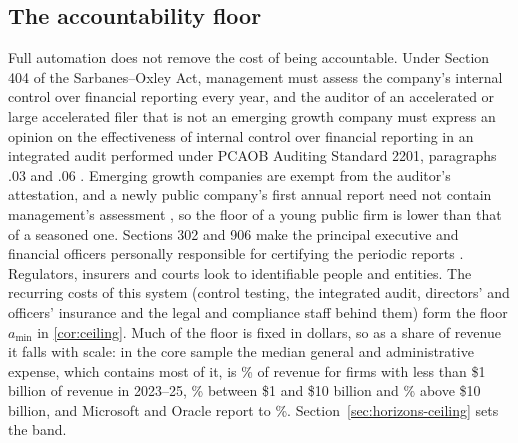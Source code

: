 \subsection{The accountability floor}
Full automation does not remove the cost of being accountable. Under Section 404 of the Sarbanes--Oxley Act, management must assess the company's internal control over financial reporting every year, and the auditor of an accelerated or large accelerated filer that is not an emerging growth company must express an opinion on the effectiveness of internal control over financial reporting in an integrated audit performed under PCAOB Auditing Standard 2201, paragraphs .03 and .06 \citep{usc2026sec7262,pcaob2026as2201,cfr2026sec229308}. Emerging growth companies are exempt from the auditor's attestation, and a newly public company's first annual report need not contain management's assessment \citep{usc2026sec7262,cfr2026sec229308}, so the floor of a young public firm is lower than that of a seasoned one. Sections 302 and 906 make the principal executive and financial officers personally responsible for certifying the periodic reports \citep{usc2026sec7241,usc2026sec1350}. Regulators, insurers and courts look to identifiable people and entities. The recurring costs of this system (control testing, the integrated audit, directors' and officers' insurance and the legal and compliance staff behind them) form the floor $a_{\min}$ in \autoref{cor:ceiling}. Much of the floor is fixed in dollars, so as a share of revenue it falls with scale: in the core sample the median general and administrative expense, which contains most of it, is \GAsmall\% of revenue for firms with less than \$1 billion of revenue in 2023--25, \GAmid\% between \$1 and \$10 billion and \GAlarge\% above \$10 billion, and Microsoft and Oracle report \GAleanLo{} to \GAleanHi\%. Section~\ref{sec:horizons-ceiling} sets the band.

